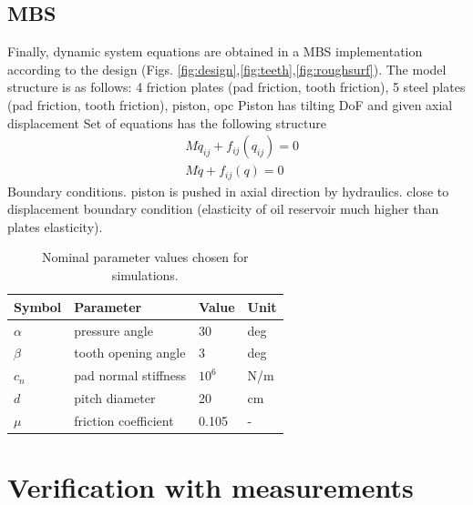 \documentclass[a4paper,fleqn]{cas-dc}
\begin{document}
\subsection{MBS}
Finally, dynamic system equations are obtained in a MBS implementation according to the design (Figs. \ref{fig:design},\ref{fig:teeth},\ref{fig:roughsurf}). The model structure is as follows: 
4 friction plates (pad friction, tooth friction),
5 steel plates (pad friction, tooth friction), 
piston, 
opc
Piston has tilting DoF and given axial displacement 
Set of equations has the following structure 
\begin{align}
	&{M}\ddot{{q}}_{ij} + f_{ij}(q_{ij}) = 0\\
	&{M}\ddot{{q}} + f_{ij}(q) = 0
\end{align}
Boundary conditions. piston is pushed in axial direction by hydraulics. close to displacement boundary condition (elasticity of oil reservoir much higher than plates elasticity).
\begin{table}[width=.9\linewidth,cols=4,pos=h]
	\caption{Nominal parameter values chosen for simulations.}\label{tab:parameters}
\begin{tabular*}{\tblwidth}{@{} LLLL@{} }
	\toprule
	Symbol & Parameter & Value & Unit\\
	\midrule
	$\alpha$ & pressure angle & 30 & deg \\
	$\beta$ & tooth opening angle & 3 & deg \\
	$c_n$ & pad normal stiffness & $10^6$ & N/m\\
	$d$ & pitch diameter & 20 & cm \\
	$\mu$ & friction coefficient & 0.105 & - \\
	\bottomrule
\end{tabular*}
\end{table}

\section{Verification with measurements}
\end{document}
